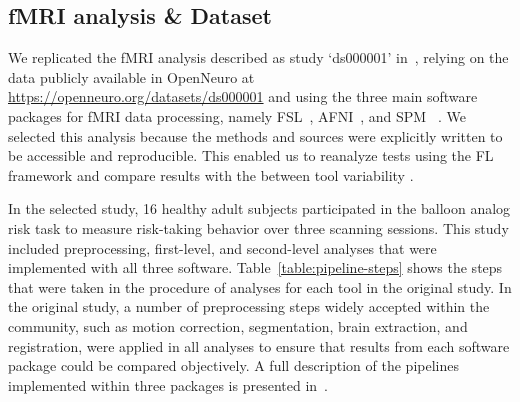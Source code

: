 \documentclass[conference]{IEEEtran}
\begin{document}
\subsection{fMRI analysis \& Dataset}

We replicated the fMRI analysis described as study `ds000001' in~\cite{bowring2019exploring}, relying on
the data publicly available in OpenNeuro at \url{https://openneuro.org/datasets/ds000001}
and using the three main software packages for fMRI data processing, namely
FSL~\cite{jenkinson2012fsl}, AFNI~\cite{cox1996afni}, and SPM~\cite{penny2011statistical} .
We selected this analysis because the methods and sources  were explicitly
written to be accessible and reproducible. This enabled us to reanalyze tests  using the FL framework and
compare results with the between tool variability .

In the selected study, 16 healthy adult subjects participated in the balloon analog risk task to measure
risk-taking behavior over three scanning sessions.
This study included preprocessing, first-level, and second-level analyses that were implemented with all three software.
Table~\ref{table:pipeline-steps} shows the steps that were taken in the procedure of analyses for each tool in the original study.
In the original study, a number of preprocessing steps widely accepted within the community, such as motion correction,
segmentation, brain extraction, and registration, were applied in all analyses to ensure that results from each software
package could be compared objectively.
A full description of the pipelines implemented within three packages is presented in~\cite{bowring2019exploring,schonberg2012decreasing}.
\end{document}
